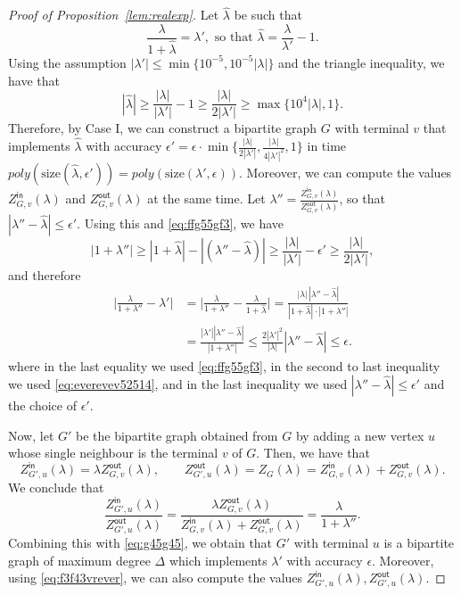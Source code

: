 \documentclass[11pt]{article}
\def\Zin{Z^{\mathsf{in}}}
\def\Zout{Z^{\mathsf{out}}}
\newcommand{\size}[1]{\mathrm{size}(#1)}
\begin{document}
\begin{proof}[Proof of Proposition~\ref{lem:realexp}]
Let $\hat{\lambda}$ be such that
\begin{equation}\label{eq:ffg55gf3}
\frac{\lambda}{1+\hat{\lambda}}=\lambda', \mbox{ so that } \hat{\lambda}=\frac{\lambda}{\lambda'}-1.
\end{equation}
Using the assumption $|\lambda'|\leq \min\{10^{-5},10^{-5}|\lambda|\}$ and the triangle inequality, we have that
\[|\hat{\lambda}|\geq \frac{|\lambda|}{|\lambda'|}-1\geq \frac{|\lambda|}{2|\lambda'|}\geq \max\{10^{4}|\lambda|,1\}.\] 
Therefore, by Case I, we can construct a bipartite graph $G$ with terminal $v$ that  implements $\hat{\lambda}$ with accuracy $\epsilon'=\epsilon \cdot \min\big\{\frac{|\lambda|}{2|\lambda'|},\frac{|\lambda|}{4|\lambda'|^2},1\big\}$ in time $poly(\size{\hat{\lambda},\epsilon'})=poly(\size{\lambda',\epsilon})$. Moreover, we can compute the values $\Zin_{G,v}(\lambda)$ and $\Zout_{G,v}(\lambda)$ at the same time.  Let $\lambda''= \frac{\Zin_{G,v}(\lambda)}{\Zout_{G,v}(\lambda)}$, so that $|\lambda''-\hat{\lambda}|\leq \epsilon'$. Using this and \eqref{eq:ffg55gf3}, we have
\begin{equation}\label{eq:everevev52514}
|1+\lambda'' |\geq  |1+\hat{\lambda}|-|(\lambda''-\hat{\lambda})|\geq \frac{|\lambda|}{|\lambda'|}-\epsilon'\geq \frac{|\lambda|}{2|\lambda'|},
\end{equation}
and therefore 
\begin{equation}\label{eq:g45g45}
\begin{aligned}
\Big|\frac{\lambda}{1+\lambda'' }-\lambda'\Big|&=\Big|\frac{\lambda}{1+\lambda'' }-\frac{\lambda}{1+\hat{\lambda}}\Big|=\frac{|\lambda |\,|\lambda''-\hat{\lambda}|}{|1+\hat{\lambda}|\cdot |1+\lambda''|}\\
&=\frac{|\lambda' ||\lambda''-\hat{\lambda}|}{|1+\lambda''|}\leq \frac{2|\lambda'|^2}{|\lambda|}|\lambda''-\hat{\lambda}|\leq \epsilon.
\end{aligned}
\end{equation}
where in the last equality we used \eqref{eq:ffg55gf3}, in the second to last inequality we used \eqref{eq:everevev52514}, and in the last inequality we used $|\lambda''-\hat{\lambda}|\leq \epsilon'$ and the choice of $\epsilon'$.

Now,  let $G'$ be the bipartite graph obtained from $G$ by adding a new vertex $u$ whose single neighbour is the terminal $v$ of $G$. Then, we have that
\begin{equation}\label{eq:f3f43vrever}
\Zin_{G',u}(\lambda)= \lambda\Zout_{G,v}(\lambda),\qquad \Zout_{G',u}(\lambda)=Z_G(\lambda)=\Zin_{G,v}(\lambda)+\Zout_{G,v}(\lambda).
\end{equation}
 We conclude that
\[\frac{\Zin_{G',u}(\lambda)}{\Zout_{G',u}(\lambda)}=\frac{\lambda\Zout_{G,v}(\lambda)}{\Zin_{G,v}(\lambda)+\Zout_{G,v}(\lambda)}=\frac{\lambda}{1+\lambda''}.\]
Combining this with \eqref{eq:g45g45}, we obtain that $G'$ with terminal $u$ is a bipartite graph of maximum degree $\Delta$ which  implements $\lambda'$ with accuracy $\epsilon$. Moreover, using \eqref{eq:f3f43vrever}, we can also compute the values $\Zin_{G',u}(\lambda),\Zout_{G',u}(\lambda)$.


\end{proof}
\end{document}
